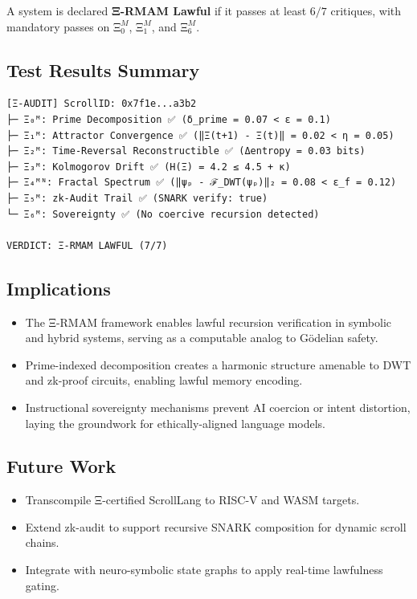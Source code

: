 \documentclass[12]{amsart}
\theoremstyle{plain}
\begin{document}
A system is declared \textbf{Ξ-RMAM Lawful} if it passes at least $6/7$ critiques, with mandatory passes on $\text{Ξ}_0^M$, $\text{Ξ}_1^M$, and $\text{Ξ}_6^M$.

\subsection{Test Results Summary}

\begin{verbatim}
[Ξ-AUDIT] ScrollID: 0x7f1e...a3b2
├─ Ξ₀ᴹ: Prime Decomposition ✅ (δ_prime = 0.07 < ε = 0.1)
├─ Ξ₁ᴹ: Attractor Convergence ✅ (‖Ξ(t+1) - Ξ(t)‖ = 0.02 < η = 0.05)
├─ Ξ₂ᴹ: Time-Reversal Reconstructible ✅ (Δentropy = 0.03 bits)
├─ Ξ₃ᴹ: Kolmogorov Drift ✅ (H(Ξ) = 4.2 ≤ 4.5 + κ)
├─ Ξ₄ᴹᴺ: Fractal Spectrum ✅ (‖ψₚ - ℱ_DWT(ψₚ)‖₂ = 0.08 < ε_f = 0.12)
├─ Ξ₅ᴹ: zk-Audit Trail ✅ (SNARK verify: true)
└─ Ξ₆ᴹ: Sovereignty ✅ (No coercive recursion detected)

VERDICT: Ξ-RMAM LAWFUL (7/7)
\end{verbatim}

\subsection{Implications}

\begin{itemize}
    \item The Ξ-RMAM framework enables lawful recursion verification in symbolic and hybrid systems, serving as a computable analog to Gödelian safety.
    \item Prime-indexed decomposition creates a harmonic structure amenable to DWT and zk-proof circuits, enabling lawful memory encoding.
    \item Instructional sovereignty mechanisms prevent AI coercion or intent distortion, laying the groundwork for ethically-aligned language models.
\end{itemize}

\subsection{Future Work}

\begin{itemize}
    \item Transcompile Ξ-certified ScrollLang to RISC-V and WASM targets.
    \item Extend zk-audit to support recursive SNARK composition for dynamic scroll chains.
    \item Integrate with neuro-symbolic state graphs to apply real-time lawfulness gating.
\end{itemize}
\end{document}

